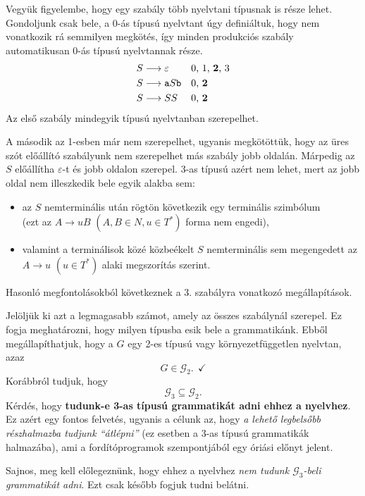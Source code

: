 \documentclass[a4paper,11pt]{article}
\newcommand{\emptyword}{\varepsilon}
\newcommand{\prodrule}[2]{#1 \longrightarrow #2}
\begin{document}
Vegyük figyelembe, hogy egy szabály több nyelvtani típusnak is része lehet. Gondoljunk csak bele, a 0-ás típusú nyelvtant úgy definiáltuk, hogy nem vonatkozik rá semmilyen megkötés, így minden produkciós szabály automatikusan 0-ás típusú nyelvtannak része.
\begin{align*}
	&\prodrule{S}{\emptyword}& & \text{0, 1, \textbf{2}, 3} \\
	&\prodrule{S}{\texttt{a}S\texttt{b}}& & \text{0, \textbf{2}} \\
	&\prodrule{S}{SS}& & \text{0, \textbf{2}}
\end{align*}
Az első szabály mindegyik típusú nyelvtanban szerepelhet.

A második az 1-esben már nem szerepelhet, ugyanis megkötöttük, hogy az üres szót előállító szabályunk nem szerepelhet más szabály jobb oldalán. Márpedig az $S$ előállítha $\emptyword$-t és jobb oldalon szerepel. 3-as típusú azért nem lehet, mert az  jobb oldal nem illeszkedik bele egyik alakba sem:
\begin{itemize}
	\item az $S$ nemterminális után rögtön következik egy terminális szimbólum \\ (ezt az $\prodrule{A}{uB}$ $(A,B \in N, u \in T^*)$ forma nem engedi), 
	\item valamint a terminálisok közé közbeékelt $S$ nemterminális sem megengedett az $\prodrule{A}{u}$ $(u \in T^*)$ alaki megszorítás szerint.
\end{itemize}

Hasonló megfontolásokból következnek a 3. szabályra vonatkozó megállapítások.

Jelöljük ki azt a legmagasabb számot, amely az összes szabálynál szerepel. Ez fogja meghatározni, hogy milyen típusba esik bele a grammatikánk. Ebből megállapíthatjuk, hogy a $G$ egy 2-es típusú vagy környezetfüggetlen nyelvtan, azaz \[ G \in \mathcal{G}_2. ~~ \checkmark\]
Korábbról tudjuk, hogy \[ \mathcal{G}_3 \subseteq \mathcal{G}_2. \] Kérdés, hogy \textbf{tudunk-e 3-as típusú grammatikát adni ehhez a nyelvhez}. Ez azért egy fontos felvetés, ugyanis a célunk az, hogy \textit{a lehető legbelsőbb részhalmazba tudjunk ``átlépni''} (ez esetben a 3-as típusú grammatikák halmazába), ami a fordítóprogramok szempontjából egy óriási előnyt jelent.

Sajnos, meg kell előlegeznünk, hogy ehhez a nyelvhez \textit{nem tudunk $\mathcal{G}_3$-beli grammatikát adni}. Ezt csak később fogjuk tudni belátni.
\end{document}
